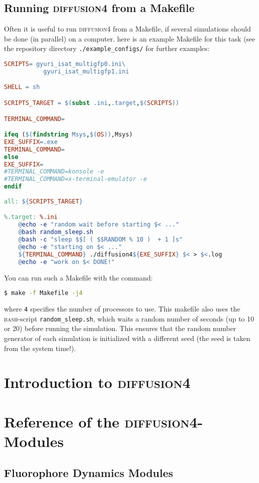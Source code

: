 \documentclass[a4paper,twoside,10pt]{report}
\newcommand{\df}{\textsc{diffusion4}\xspace}
\newcommand{\bash}{\textsc{bash}\xspace}
\begin{document}
\section{Running \df from a Makefile}
\label{sec:RunningDfFromAMakefile}
Often it is useful to run \df from a Makefile, if several simulations should be done (in parallel) on a computer. here is an example Makefile for this task (see the repository directory \texttt{./example\_configs/} for further examples:
\begin{lstlisting}[language=make] 
SCRIPTS= gyuri_isat_multigfp0.ini\
	       gyuri_isat_multigfp1.ini 

SHELL = sh

SCRIPTS_TARGET = $(subst .ini,.target,$(SCRIPTS))

TERMINAL_COMMAND=		

ifeq ($(findstring Msys,$(OS)),Msys)
EXE_SUFFIX=.exe
TERMINAL_COMMAND=
else
EXE_SUFFIX=
#TERMINAL_COMMAND=konsole -e 
#TERMINAL_COMMAND=x-terminal-emulator -e 
endif		
		 
all: ${SCRIPTS_TARGET}

%.target: %.ini
	@echo -e "random wait before starting $< ..."
	@bash random_sleep.sh
	@bash -c "sleep $$[ ( $$RANDOM % 10 )  + 1 ]s"
	@echo -e "starting on $< ..."
	${TERMINAL_COMMAND} ./diffusion4${EXE_SUFFIX} $< > $<.log
	@echo -e "work on $< DONE!"
\end{lstlisting}
You can run such a Makefile with the command:
\begin{lstlisting}[language=bash] 
$ make -f Makefile -j4
\end{lstlisting}
where \texttt{4} specifies the number of processors to use. This makefile also uses the \bash-script \texttt{random\_sleep.sh}, which waits a random number of seconds (up to 10 or 20) before running  the simulation. This ensures that the random number generator of each simulation is initialized with a different seed (the seed is taken from the system time!).


\chapter{Introduction to \df}
\label{sec:IntroductionToDf}


\chapter{Reference of the \df-Modules}
\label{sec:ReferenceOfTheDfModules}
\section{Fluorophore Dynamics Modules}
\label{sec:TrajectoryModules}
\end{document}
